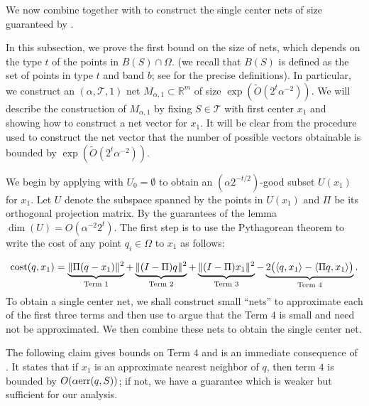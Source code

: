 \documentclass[11pt]{article}
\theoremstyle{restate}
\theoremstyle{definition}
\newcommand{\R}{\ensuremath{\mathbb{R}}}
\newcommand{\norm}[1]{\ensuremath{\|#1\|}}
\newcommand{\cost}{\textnormal{cost}}
\newcommand{\err}{\textnormal{err}}
\begin{document}
We now combine  together with  to construct the single center nets of size guaranteed by . 

In this subsection, we prove the first bound on the size of nets, which depends on the type $t$ of the points in $B(S) \cap \Omega$. (we recall that $B(S)$ is defined as the set of points in type $t$ and band $b$; see  for the precise definitions). In particular, we  construct an $(\alpha, \mathcal{T}, 1)$ net $M_{\alpha,1} \subset \R^m$ of size $\exp(\tilde{O}(2^t \alpha^{-2}))$. We will describe the construction of $M_{\alpha,1}$ by fixing $S \in \mathcal{T}$ with first center $x_1$ and showing how to construct a net vector for $x_1$. It will be clear from the procedure used to construct the net vector that the number of possible vectors obtainable is bounded by $\exp(\tilde{O}(2^t \alpha^{-2}))$.

 
 We begin by applying  with $U_0 = \emptyset$ to obtain an $(\alpha2^{-t/2})$-good subset $U(x_1)$ for $x_1$. Let  $U$ denote the subspace spanned by the points in $U(x_1)$ and $\Pi$ be its orthogonal projection matrix. By the guarantees of the lemma $\dim(U) = O(\alpha^{-2} 2^t)$. The first step is to use the Pythagorean theorem to write the cost of any point $q_i \in \Omega$ to $x_1$ as follows:

\begin{align}\label{eq: pythagoras}
\begin{split}
    \cost(q,x_1)=\underbrace{\norm{\Pi(q-x_1)}^2}_{\text{Term 1}} 
    + \underbrace{\norm{(I-\Pi)q}^2}_{\text{Term 2}} 
    + \underbrace{\norm{(I-\Pi)x_1}^2}_{\text{Term 3}} -\underbrace{2  \big(\langle q, x_1 \rangle - \langle \Pi q, x_1 \rangle\big)  }_{\text{Term 4}}. 
\end{split}
\end{align}
To obtain a single center net, we shall construct small ``nets'' to approximate each of the first three terms and then use  to argue that the Term $4$ is small and need not be approximated. We then combine these nets to obtain the single center net.
 

The following claim gives bounds on Term $4$ and is an immediate consequence of . It states that if $x_1$ is an approximate nearest neighbor of $q$, then term $4$ is bounded by $O(\alpha \err(q,S))$; if not, we have a guarantee which is weaker but sufficient for our analysis.
\end{document}
